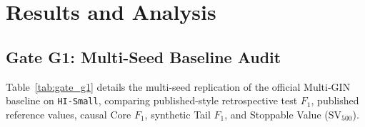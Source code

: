 \documentclass[pdflatex,sn-mathphys,Numbered]{sn-jnl}
\renewenvironment{table*}[1][!htbp]{\begin{tableorg}[#1]\begin{center}\tablebodyfont}{\end{center}\end{tableorg}}
\theoremstyle{thmstyleone}
\theoremstyle{thmstyletwo}
\theoremstyle{thmstylethree}
\begin{document}
\section{Results and Analysis}
\label{sec:results}

\subsection{Gate G1: Multi-Seed Baseline Audit}
Table~\ref{tab:gate_g1} details the multi-seed replication of the official Multi-GIN baseline on \texttt{HI-Small}, comparing published-style retrospective test $F_1$, published reference values, causal Core $F_1$, synthetic Tail $F_1$, and Stoppable Value ($\text{SV}_{500}$).

\begin{table}[!htbp]
\centering
\small
\caption{\textbf{Gate G1 Multi-Seed Baseline Audit (\texttt{HI-Small}, Multi-GIN).} Comparison of published retrospective $F_1$ against genuine causal Core $F_1$, synthetic Tail $F_1$, and Stoppable Value ($\text{SV}_{500}$) across three random seeds.}
\label{tab:gate_g1}
\end{table}
\end{document}
